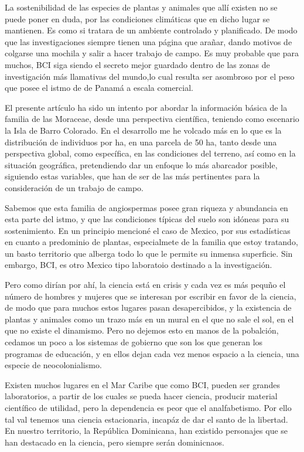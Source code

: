 \documentclass[11pt,]{article}
\begin{document}
La sostenibilidad de las especies de plantas y animales que allí existen
no se puede poner en duda, por las condiciones climáticas que en dicho
lugar se mantienen. Es como si tratara de un ambiente controlado y
planificado. De modo que las investigaciones siempre tienen una página
que arañar, dando motivos de colgarse una mochila y salir a hacer
trabajo de campo. Es muy probable que para muchos, BCI siga siendo el
secreto mejor guardado dentro de las zonas de investigación más
llamativas del mundo,lo cual resulta ser asombroso por el peso que posee
el istmo de de Panamá a escala comercial.

El presente artículo ha sido un intento por abordar la información
básica de la familia de las Moraceae, desde una perspectiva científica,
teniendo como escenario la Isla de Barro Colorado. En el desarrollo me
he volcado más en lo que es la distribución de individuos por ha, en una
parcela de 50 ha, tanto desde una perspectiva global, como específica,
en las condiciones del terreno, así como en la situación geográfica,
pretendiendo dar un enfoque lo más abarcador posible, siguiendo estas
variables, que han de ser de las más pertinentes para la consideración
de un trabajo de campo.

Sabemos que esta familia de angiospermas posee gran riqueza y abundancia
en esta parte del istmo, y que las condiciones típicas del suelo son
idóneas para su sostenimiento. En un principio mencioné el caso de
Mexico, por sus estadísticas en cuanto a predominio de plantas,
especialmete de la familia que estoy tratando, un basto territorio que
alberga todo lo que le permite su inmensa superficie. Sin embargo, BCI,
es otro Mexico tipo laboratoio destinado a la investigación.

Pero como dirían por ahí, la ciencia está en crisis y cada vez es más
pequño el número de hombres y mujeres que se interesan por escribir en
favor de la ciencia, de modo que para muchos estos lugares pasan
desapercibidos, y la existencia de plantas y animales como un trazo más
en un mural en el que no sale el sol, en el que no existe el dinamismo.
Pero no dejemos esto en manos de la pobalción, cedamos un poco a los
sistemas de gobierno que son los que generan los programas de educación,
y en ellos dejan cada vez menos espacio a la ciencia, una especie de
neocolonialismo.

Existen muchos lugares en el Mar Caribe que como BCI, pueden ser grandes
laboratorios, a partir de los cuales se pueda hacer ciencia, producir
material científico de utilidad, pero la dependencia es peor que el
analfabetismo. Por ello tal val tenemos una ciencia estacionaria,
incapáz de dar el santo de la libertad. En nuestro territorio, la
República Dominicana, han existido personajes que se han destacado en la
ciencia, pero siempre serán dominicnaos.
\end{document}
